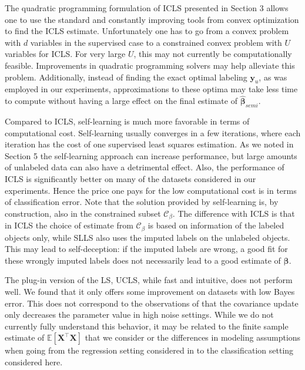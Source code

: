 \documentclass{llncs}
\newcommand{\featdim}{d}
\newcommand{\Nunl}{U}
\newcommand{\Cb}{\mathcal{C}_{\beta}}
\begin{document}
The quadratic programming formulation of ICLS presented in Section 3 allows one to use the standard and constantly improving tools from convex optimization to find the ICLS estimate. Unfortunately one has to go from a convex problem with $\featdim$ variables in the supervised case to a constrained convex problem with $\Nunl$ variables for ICLS. For very large $\Nunl$, this may not currently be computationally feasible. Improvements in quadratic programming solvers may help alleviate this problem. Additionally, instead of finding the exact optimal labeling $\mathbf{y}_u$, as was employed in our experiments, approximations to these optima may take less time to compute without having a large effect on the final estimate of $\boldsymbol{\hat{\beta}}_{semi}$.

Compared to ICLS, self-learning is much more favorable in terms of computational cost. Self-learning usually converges in a few iterations, where each iteration has the cost of one supervised least squares estimation. As we noted in Section 5 the self-learning approach can increase performance, but large amounts of unlabeled data can also have a detrimental effect. Also, the performance of ICLS is significantly better on many of the datasets considered in our experiments. Hence the price one pays for the low computational cost is in terms of classification error. Note that the solution provided by self-learning is, by construction, also in the constrained subset $\Cb$. The difference with ICLS is that in ICLS the choice of estimate from $\Cb$ is based on information of the labeled objects only, while SLLS also uses the imputed labels on the unlabeled objects. This may lead to self-deception: if the imputed labels are wrong, a good fit for these wrongly imputed labels does not necessarily lead to a good estimate of $\boldsymbol{\beta}$.

The plug-in version of the LS, UCLS, while fast and intuitive, does not perform well. We found that it only offers some improvement on datasets with low Bayes error. This does not correspond to the observations of \cite{Shaffer1991} that the covariance update only decreases the parameter value in high noise settings. While we do not currently fully understand this behavior, it may be related to the finite sample estimate of $\mathbb{E}[\mathbf{X}^\top\mathbf{X}]$ that we consider or the differences in modeling assumptions when going from the regression setting considered in \cite{Shaffer1991} to the classification setting considered here.
\end{document}
